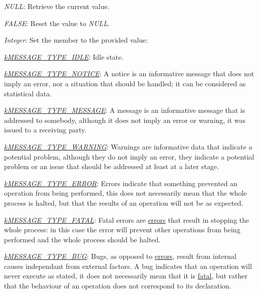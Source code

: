 \begin{DoxyItemize}
\item {\itshape N\-U\-L\-L}\-: Retrieve the current value. 
\item {\itshape F\-A\-L\-S\-E}\-: Reset the value to {\itshape N\-U\-L\-L}. 
\item {\itshape Integer}\-: Set the member to the provided value\-: 
\begin{DoxyItemize}
\item {\itshape \hyperlink{}{k\-M\-E\-S\-S\-A\-G\-E\-\_\-\-T\-Y\-P\-E\-\_\-\-I\-D\-L\-E}}\-: Idle state. 
\item {\itshape \hyperlink{}{k\-M\-E\-S\-S\-A\-G\-E\-\_\-\-T\-Y\-P\-E\-\_\-\-N\-O\-T\-I\-C\-E}}\-: A notice is an informative message that does not imply an error, nor a situation that should be handled; it can be considered as statistical data. 
\item {\itshape \hyperlink{}{k\-M\-E\-S\-S\-A\-G\-E\-\_\-\-T\-Y\-P\-E\-\_\-\-M\-E\-S\-S\-A\-G\-E}}\-: A message is an informative message that is addressed to somebody, although it does not imply an error or warning, it was issued to a receiving party. 
\item {\itshape \hyperlink{}{k\-M\-E\-S\-S\-A\-G\-E\-\_\-\-T\-Y\-P\-E\-\_\-\-W\-A\-R\-N\-I\-N\-G}}\-: Warnings are informative data that indicate a potential problem, although they do not imply an error, they indicate a potential problem or an issue that should be addressed at least at a later stage. 
\item {\itshape \hyperlink{}{k\-M\-E\-S\-S\-A\-G\-E\-\_\-\-T\-Y\-P\-E\-\_\-\-E\-R\-R\-O\-R}}\-: Errors indicate that something prevented an operation from being performed, this does not necessarily mean that the whole process is halted, but that the results of an operation will not be as expected. 
\item {\itshape \hyperlink{}{k\-M\-E\-S\-S\-A\-G\-E\-\_\-\-T\-Y\-P\-E\-\_\-\-F\-A\-T\-A\-L}}\-: Fatal errors are \hyperlink{}{errors} that result in stopping the whole process\-: in this case the error will prevent other operations from being performed and the whole process should be halted. 
\item {\itshape \hyperlink{}{k\-M\-E\-S\-S\-A\-G\-E\-\_\-\-T\-Y\-P\-E\-\_\-\-B\-U\-G}}\-: Bugs, as opposed to \hyperlink{}{errors}, result from internal causes independant from external factors. A bug indicates that an operation will never execute as stated, it does not necessarily mean that it is \hyperlink{}{fatal}, but rather that the behaviour of an operation does not correspond to its declaration. 
\end{DoxyItemize}
\end{DoxyItemize}

